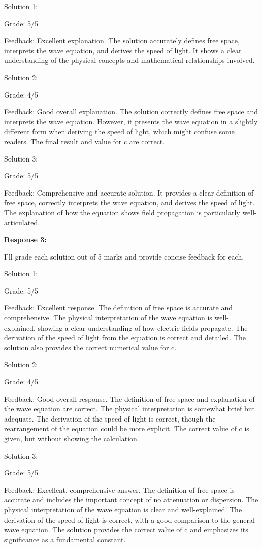 \documentclass[a4paper,11pt]{article}
\begin{document}
Solution 1:

Grade: 5/5

Feedback: Excellent explanation. The solution accurately defines free space, interprets the wave equation, and derives the speed of light. It shows a clear understanding of the physical concepts and mathematical relationships involved.

Solution 2:

Grade: 4/5

Feedback: Good overall explanation. The solution correctly defines free space and interprets the wave equation. However, it presents the wave equation in a slightly different form when deriving the speed of light, which might confuse some readers. The final result and value for c are correct.

Solution 3:

Grade: 5/5

Feedback: Comprehensive and accurate solution. It provides a clear definition of free space, correctly interprets the wave equation, and derives the speed of light. The explanation of how the equation shows field propagation is particularly well-articulated.

\bigskip
\textbf{Response 3:}

I'll grade each solution out of 5 marks and provide concise feedback for each.

Solution 1:

Grade: 5/5

Feedback: Excellent response. The definition of free space is accurate and comprehensive. The physical interpretation of the wave equation is well-explained, showing a clear understanding of how electric fields propagate. The derivation of the speed of light from the equation is correct and detailed. The solution also provides the correct numerical value for c.

Solution 2:

Grade: 4/5

Feedback: Good overall response. The definition of free space and explanation of the wave equation are correct. The physical interpretation is somewhat brief but adequate. The derivation of the speed of light is correct, though the rearrangement of the equation could be more explicit. The correct value of c is given, but without showing the calculation.

Solution 3:

Grade: 5/5

Feedback: Excellent, comprehensive answer. The definition of free space is accurate and includes the important concept of no attenuation or dispersion. The physical interpretation of the wave equation is clear and well-explained. The derivation of the speed of light is correct, with a good comparison to the general wave equation. The solution provides the correct value of c and emphasizes its significance as a fundamental constant.
\end{document}
